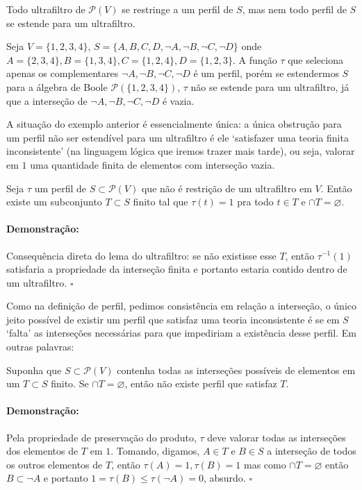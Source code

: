 \documentclass[11pt]{article}
\newcommand{\pulinho}{\vspace{.5cm}}
\theoremstyle{definition}
\theoremstyle{definition}
\theoremstyle{definition}
\theoremstyle{definition}
\newtheorem*{prop*}{Proposição}
\newenvironment{proposicao*}{
\definecolor{shadecolor}{HTML}{FFDBDF}
\begin{shaded}
\begin{prop*}
}
{
\end{prop*}
\end{shaded}
}
\theoremstyle{definition}
\theoremstyle{definition}
\theoremstyle{definition}
\theoremstyle{definition}
\theoremstyle{definition}
\theoremstyle{definition}
\newtheorem*{example*}{Exemplo}
\newenvironment{exemplo*}{
\definecolor{shadecolor}{HTML}{b9e6d3}
\begin{shaded}
\begin{example*}
}
{
\end{example*}
\end{shaded}
}
\theoremstyle{definition}
\theoremstyle{definition}
\newenvironment{prova}{\paragraph{Demonstração:}}{\hfill$\square$ 
\pulinho
}
\theoremstyle{definition}
\theoremstyle{definition}
\begin{document}
Todo ultrafiltro de $\mathcal{P}(V)$ se restringe a um perfil de $S$, mas nem todo perfil de $S$ se estende para um ultrafiltro.

\begin{exemplo*}
  Seja $V = \{1,2,3,4\}$, $S = \{A,B,C,D,\lnot A, \lnot B, \lnot C, \lnot D\}$ onde $A = \{2,3,4\}, B = \{1,3,4\}, C = \{1,2,4\}, D = \{1,2,3\}$. A função $\tau$ que seleciona apenas os complementares $\lnot A, \lnot B, \lnot C, \lnot D$ é um perfil, porém se estendermos $S$ para a álgebra de Boole $\mathcal{P}(\{1,2,3,4\})$, $\tau$ não se estende para um ultrafiltro, já que a interseção de $\lnot A, \lnot B, \lnot C, \lnot D$ é vazia.
\end{exemplo*}

A situação do exemplo anterior é essencialmente única: a única obstrução para um perfil não ser estendível para um ultrafiltro é ele `satisfazer uma teoria finita inconsistente' (na linguagem lógica que iremos trazer mais tarde), ou seja, valorar em $1$ uma quantidade finita de elementos com interseção vazia.

\begin{proposicao*}
Seja $\tau$ um perfil de $S \subset \mathcal{P}(V)$ que não é restrição de um ultrafiltro em $V$. Então existe um subconjunto $T \subset S$ finito tal que $\tau(t) = 1$ pra todo $t \in T$ e $\cap T = \varnothing$.
\end{proposicao*}
\begin{prova}
  Consequência direta do lema do ultrafiltro: se não existisse esse $T$, então $\tau^{-1}(1)$ satisfaria a propriedade da interseção finita e portanto estaria contido dentro de um ultrafiltro.
\end{prova}

Como na definição de perfil, pedimos consistência em relação a interseção, o único jeito possível de existir um perfil que satisfaz uma teoria inconsistente é se em $S$ `falta' as interseções necessárias para que impediriam a existência desse perfil. Em outras palavras:

\begin{proposicao*}
  Suponha que $S \subset \mathcal{P}(V)$ contenha todas as interseções possíveis de elementos em um $T \subset S$ finito. Se $\cap T = \varnothing$, então não existe perfil que satisfaz $T$.
\end{proposicao*}
\begin{prova}
  Pela propriedade de preservação do produto, $\tau$ deve valorar todas as interseções dos elementos de $T$ em $1$. Tomando, digamos, $A \in T$ e $B \in S$ a interseção de todos os outros elementos de $T$, então $\tau(A) = 1, \tau(B) = 1$ mas como $\cap T = \varnothing$ então $B \subset \lnot A$ e portanto $1 = \tau(B) \leq \tau(\lnot A) = 0$, absurdo.
\end{prova}
\end{document}
